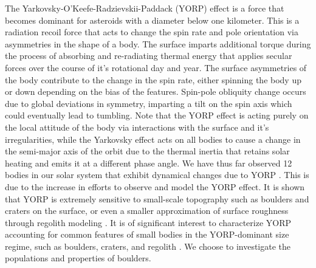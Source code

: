 The Yarkovsky-O'Keefe-Radzievskii-Paddack (YORP) effect is a force that becomes dominant for asteroids with a diameter below one kilometer. This is a radiation recoil force that acts to change the spin rate and pole orientation via asymmetries in the shape of a body. The surface imparts additional torque during the process of absorbing and re-radiating thermal energy that applies secular forces over the course of it's rotational day and year. The surface asymmetries of the body contribute to the change in the spin rate, either spinning the body up or down depending on the bias of the features. Spin-pole obliquity change occurs due to global deviations in symmetry, imparting a tilt on the spin axis which could eventually lead to tumbling. Note that the YORP effect is acting purely on the local attitude of the body via interactions with the surface and it's irregularities, while the Yarkovsky effect acts on all bodies to cause a change in the semi-major axis of the orbit due to the thermal inertia that retains solar heating and emits it at a different phase angle\cite{Vokrouhlicky2000}. We have thus far observed 12 bodies in our solar system that exhibit dynamical changes due to YORP \cite{Durech2023}. This is due to the increase in efforts to observe and model the YORP effect. It is shown that YORP is extremely sensitive to small-scale topography such as boulders and craters on the surface, or even a smaller approximation of surface roughness through regolith modeling \cite{Statler2009}\cite{Rozitis2011}\cite{Rozitis2013}. It is of significant interest to characterize YORP accounting for common features of small bodies in the YORP-dominant size regime, such as boulders, craters, and regolith \cite{Zhou2023}\cite{Walsh2019}. We choose to investigate the populations and properties of boulders. 


